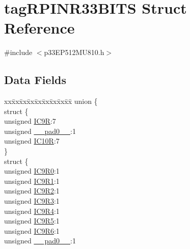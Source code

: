 \hypertarget{structtag_r_p_i_n_r33_b_i_t_s}{}\section{tag\+R\+P\+I\+N\+R33\+B\+I\+TS Struct Reference}
\label{structtag_r_p_i_n_r33_b_i_t_s}


{\ttfamily \#include $<$p33\+E\+P512\+M\+U810.\+h$>$}

\subsection*{Data Fields}
\begin{DoxyCompactItemize}
\item 
\begin{tabbing}
xx\=xx\=xx\=xx\=xx\=xx\=xx\=xx\=xx\=\kill
union \{\\
\>struct \{\\
\>\>unsigned \hyperlink{structtag_r_p_i_n_r33_b_i_t_s_ac88b5f18ef4db6d67f64da3cb55e51e2}{IC9R}:7\\
\>\>unsigned \hyperlink{structtag_r_p_i_n_r33_b_i_t_s_adf71f3d8410c1f1dbbc96680a92c49af}{\_\_pad0\_\_}:1\\
\>\>unsigned \hyperlink{structtag_r_p_i_n_r33_b_i_t_s_ac24604d5086d2140e69821a864c3576b}{IC10R}:7\\
\>\} \\
\>struct \{\\
\>\>unsigned \hyperlink{structtag_r_p_i_n_r33_b_i_t_s_a831b8448673132f46efb9e697450fdf4}{IC9R0}:1\\
\>\>unsigned \hyperlink{structtag_r_p_i_n_r33_b_i_t_s_a8d7c1c02eee440aef3040829e29422a4}{IC9R1}:1\\
\>\>unsigned \hyperlink{structtag_r_p_i_n_r33_b_i_t_s_a99b043b7a507b7b67772eb95f1c62c51}{IC9R2}:1\\
\>\>unsigned \hyperlink{structtag_r_p_i_n_r33_b_i_t_s_a61859edf01f1dc83591a073f6eb8f716}{IC9R3}:1\\
\>\>unsigned \hyperlink{structtag_r_p_i_n_r33_b_i_t_s_a47a068ba5e94dcc423651e38c40030ee}{IC9R4}:1\\
\>\>unsigned \hyperlink{structtag_r_p_i_n_r33_b_i_t_s_a356cb74af3d7f07192f9221938f79a70}{IC9R5}:1\\
\>\>unsigned \hyperlink{structtag_r_p_i_n_r33_b_i_t_s_ae34a8b6943162bb1aec77199afba95a2}{IC9R6}:1\\
\>\>unsigned \hyperlink{structtag_r_p_i_n_r33_b_i_t_s_adf71f3d8410c1f1dbbc96680a92c49af}{\_\_pad0\_\_}:1\\

\end{tabbing}
\end{DoxyCompactItemize}
